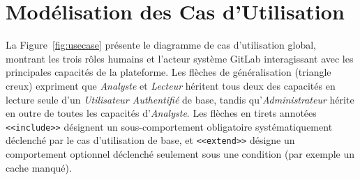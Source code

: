 \documentclass[12pt,a4paper,oneside]{report}
\begin{document}
\section{Modélisation des Cas d'Utilisation}
La Figure~\ref{fig:usecase} présente le diagramme de cas d'utilisation global, montrant les trois rôles humains et l'acteur système GitLab interagissant avec les principales capacités de la plateforme. Les flèches de généralisation (triangle creux) expriment que \emph{Analyste} et \emph{Lecteur} héritent tous deux des capacités en lecture seule d'un \emph{Utilisateur Authentifié} de base, tandis qu'\emph{Administrateur} hérite en outre de toutes les capacités d'\emph{Analyste}. Les flèches en tirets annotées \texttt{<<include>>} désignent un sous-comportement obligatoire systématiquement déclenché par le cas d'utilisation de base, et \texttt{<<extend>>} désigne un comportement optionnel déclenché seulement sous une condition (par exemple un cache manqué).
\end{document}
